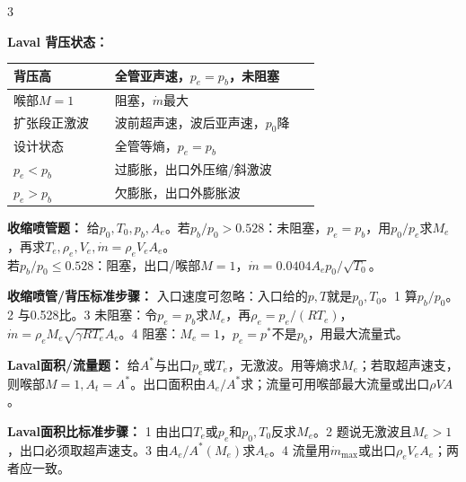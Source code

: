 \documentclass[a4paper]{article}
\newcommand{\sect}[1]{\par{\bfseries\color{Q}#1：}}
\begin{document}
\begin{multicols}{3}
{\sect{Laval 背压状态}
\renewcommand{\arraystretch}{0.76}\begin{tabular}{|p{0.30\linewidth}|p{0.61\linewidth}|}
\hline 背压高 & 全管亚声速，$p_e=p_b$，未阻塞\\ \hline
喉部$M=1$ & 阻塞，$\dot m$最大\\ \hline
扩张段正激波 & 波前超声速，波后亚声速，$p_0$降\\ \hline
设计状态 & 全管等熵，$p_e=p_b$\\ \hline
$p_e<p_b$ & 过膨胀，出口外压缩/斜激波\\ \hline
$p_e>p_b$ & 欠膨胀，出口外膨胀波\\ \hline
\end{tabular}\renewcommand{\arraystretch}{1}

\sect{收缩喷管题}
给$p_0,T_0,p_b,A_e$。若$p_b/p_0>0.528$：未阻塞，$p_e=p_b$，用$p_0/p_e$求$M_e$，再求$T_e,\rho_e,V_e,\dot m=\rho_eV_eA_e$。\\
若$p_b/p_0\le0.528$：阻塞，出口/喉部$M=1$，$\dot m=0.0404A_ep_0/\sqrt{T_0}$。
\sect{收缩喷管/背压标准步骤}
入口速度可忽略：入口给的$p,T$就是$p_0,T_0$。1 算$p_b/p_0$。2 与0.528比。3 未阻塞：令$p_e=p_b$求$M_e$，再$\rho_e=p_e/(RT_e)$，$\dot m=\rho_eM_e\sqrt{\gamma RT_e}A_e$。4 阻塞：$M_e=1$，$p_e=p^*$不是$p_b$，用最大流量式。

\sect{Laval面积/流量题}
给$A^*$与出口$p_e$或$T_e$，无激波。用等熵求$M_e$；若取超声速支，则喉部$M=1,A_t=A^*$。出口面积由$A_e/A^*$求；流量可用喉部最大流量或出口$\rho VA$。
\sect{Laval面积比标准步骤}
1 由出口$T_e$或$p_e$和$p_0,T_0$反求$M_e$。2 题说无激波且$M_e>1$，出口必须取超声速支。3 由$A_e/A^*(M_e)$求$A_e$。4 流量用$\dot m_{\max}$或出口$\rho_eV_eA_e$；两者应一致。

}
\end{multicols}
\end{document}
